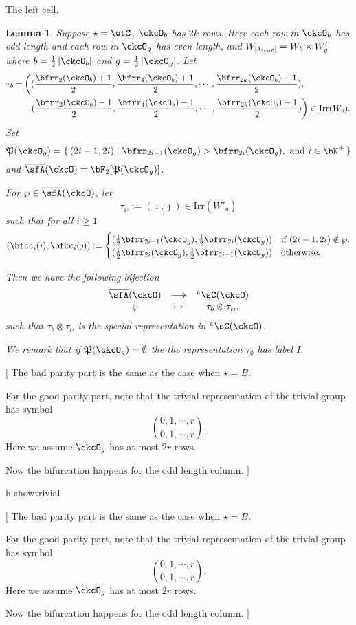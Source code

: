 \documentclass[12pt,a4paper]{amsart}
\newcommand{\trivial}[2][]{\if\relax\detokenize{#1}\relax
  {%
      \color{orange} \vspace{0em} $[$  #2 $]$
      \color{black}
  }
  \else
\ifx#1h
\ifcsname showtrivial\endcsname
{%
    \color{orange} \vspace{0em}  $[$ #2 $]$
    \color{black}
}
\fi
\else {\red Wrong argument!} \fi
\fi
}
\def\abs#1{\left|{#1}\right|}
\newcommand{\CQ}{{\mathcal {Q}}}
\numberwithin{equation}{section}
\newtheorem{lem}[thm]{Lemma}
\theoremstyle{remark}
\def\half{{\tfrac{1}{2}}}
\def\Irr{\mathrm{Irr}}
\def\WLamck{W_{[\lambda_{\ckcO}]}}
\def\LC{{}^{\scriptscriptstyle L}\sC}
\def\CQ{\overline{\sfA}}%
\def\CPP{\mathfrak{P}}
\begin{document}
The left cell.
\begin{lem}
  Suppose $\star = \wtC$, $\ckcO_{b}$ has $2k$ rows. Here each row in $\ckcO_{b}$ has
  odd length and each row in $\ckcO_{g}$ has even length, and
  $\WLamck = W_{b}\times W'_{g}$ where $b=\half \abs{\ckcO_{b}}$ and
  $g = \half\abs{\ckcO_{g}}$.
  Let
  \[
    \begin{split}
      \tau_{b} =  & \left( (\frac{\bfrr_{2}(\ckcO_{b})+1}{2}, \frac{\bfrr_{4}(\ckcO_{b})+1}{2}, \cdots, \frac{\bfrr_{2k}(\ckcO_{b})+1}{2}),\right.\\
        &\ \ \left. (\frac{\bfrr_{2}(\ckcO_{b})-1}{2}, \frac{\bfrr_{4}(\ckcO_{b})-1}{2}, \cdots, \frac{\bfrr_{2k}(\ckcO_{b})-1}{2})\right) \in \Irr(W_{b}).
    \end{split}
  \]
  Set
  \[
    \CPP(\ckcO_{g}) = \set{(2i-1,2i)| \bfrr_{2i-1}(\ckcO_{g})> \bfrr_{2i}(\ckcO_{g}), \text{
        and } i\in \bN^{+}}
  \]
  and $\CQ(\ckcO)= \bF_{2}[\CPP(\ckcO_{g})]$.

  For $\wp \in \CQ(\ckcO)$, let
  \[
    \tau_{\wp} := (\imath,\jmath) \in \Irr(W'_{g})
  \]
  such that for all $i\geq 1$
  \[
  (\bfcc_{i}(\imath), \bfcc_{i}(\jmath)):=
  \begin{cases}
    (\half \bfrr_{2i-1}(\ckcO_{g}), \half \bfrr_{2i}(\ckcO_{g}))
    & \text{if } (2i-1,2i)\notin \wp,\\
    (\half \bfrr_{2i}(\ckcO_{g}),\half \bfrr_{2i-1}(\ckcO_{g})) & \text{otherwise.}
  \end{cases}
  \]

  Then we have the following bijection
  \[
    \begin{array}{ccc}
      \CQ(\ckcO) &\longrightarrow & \LC(\ckcO)\\
      \wp & \mapsto & \tau_{b}\otimes \tau_{\wp},
    \end{array}
  \]
  such that $\tau_{b}\otimes \tau_{\wp}$ is the special representation in
  $\LC(\ckcO)$.

  We remark that if $\CPP(\ckcO_{g})=\emptyset$ the the
  representation $\tau_{\emptyset}$ has label $I$.
\end{lem}

\trivial{
  The bad parity part is the same as the case when $\star= B$.


  For the good parity part, note that the trivial representation of
  the trivial group has symbol
  \[
    \binom{0,1,\cdots, r}{0,1,\cdots, r}.
  \]
  Here we assume $\ckcO_{g}$ has at most $2r$ rows.

  Now the bifurcation happens for the odd length column.
  }
\end{document}

